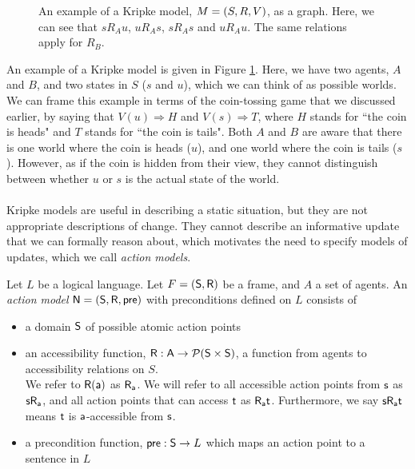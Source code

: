 \begin{figure}
\centering
{}
\caption[Kripke model example of coin-game]{An example of a Kripke model, $M = (S,R,V)$, as a graph. Here, we can see that
$s R_A u$, $u R_A s$, $s R_A s$ and $u R_A u$. The same relations apply for
$R_B$.}
\label{figure:exampleModel}
\end{figure}

An example of a Kripke model is given in Figure \ref{figure:exampleModel}.
Here, we have two agents, $A$ and $B$, and two states in $S$ ($s$ and $u$), which we can think
of as possible worlds.
We can frame this example in terms of the coin-tossing game that we discussed earlier, by saying
that $V(u) \Rightarrow H$ and $V(s) \Rightarrow T$, where $H$ stands for ``the coin is heads"
and $T$ stands for ``the coin is tails".
Both $A$ and $B$ are aware that there is one world where the coin is heads ($u$), and one
world where the coin is tails ($s$).
However, as if the coin is hidden from their view, they cannot distinguish between whether $u$ or
$s$ is the actual state of the world.\\
\\
Kripke models are useful in describing a static situation, but they are not appropriate descriptions
of change.
They cannot describe an informative update that we can formally reason about, which motivates the
need to specify models of updates, which we call {\em action models}.

\begin{defn} \label{evModel}
	Let $L$ be a logical language.
	Let $F = (\mathrm{\mathsf{S}}, \mathrm{\mathsf{R}})$ be a frame, and $A$ a set of agents.
	An {\em action model} $\mathrm{\mathsf{\mathrm{\mathsf{N}} = (S, R, pre)}}$ with preconditions defined
  on $L$ consists of
	\begin{itemize}
		\item a domain $\mathrm{\mathsf{S}}$ of possible atomic action points
		\item an accessibility function, $\mathrm{\mathsf{R: A \to \mathcal{P}(S \times
        S)}}$, a function from agents to
		accessibility relations on $S$.\\
		We refer to $\mathrm{\mathsf{R(a)}}$ as $\mathrm{\mathsf{R_a}}$.
		We will refer to all accessible action points from $\mathrm{\mathsf{s}}$ as
    $\mathrm{\mathsf{s R_a}}$, and all action points that
		can access $\mathrm{\mathsf{t}}$ as $\mathrm{\mathsf{R_a t}}$.
		Furthermore, we say $\mathrm{\mathsf{s R_a t}}$ means $\mathrm{\mathsf{t}}$ is
    $\mathrm{\mathsf{a}}$-accessible from $\mathrm{\mathsf{s}}$.
		\item a precondition function, $\mathrm{\mathsf{pre: S}} \to L$ which maps an action point to a
		sentence in $L$
	\end{itemize}
\end{defn}

